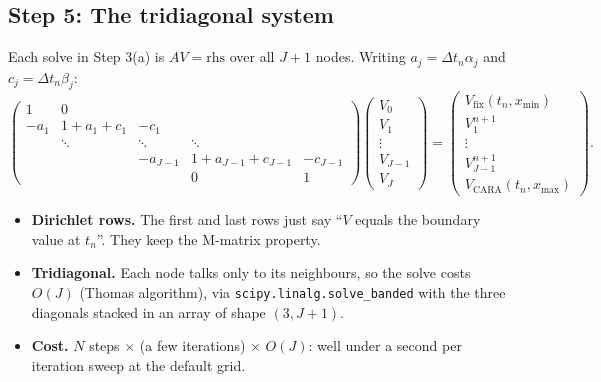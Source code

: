 \documentclass[11pt]{article}
\begin{document}
\subsection*{Step 5: The tridiagonal system}
Each solve in Step 3(a) is $AV=\text{rhs}$ over all $J+1$ nodes. Writing
$a_j=\Delta t_n\alpha_j$ and $c_j=\Delta t_n\beta_j$:
\[
\begin{pmatrix}
1 & 0 \\
-a_1 & 1+a_1+c_1 & -c_1 \\
 & \ddots & \ddots & \ddots \\
 & & -a_{J-1} & 1+a_{J-1}+c_{J-1} & -c_{J-1} \\
 & & & 0 & 1
\end{pmatrix}
\begin{pmatrix} V_0 \\ V_1 \\ \vdots \\ V_{J-1} \\ V_J \end{pmatrix}
=
\begin{pmatrix} V_{\text{fix}}(t_n,x_{\min}) \\ V_1^{n+1} \\ \vdots \\ V_{J-1}^{n+1} \\
                V_{\text{CARA}}(t_n,x_{\max}) \end{pmatrix}.
\]
\begin{itemize}
  \item \textbf{Dirichlet rows.} The first and last rows just say ``$V$ equals the boundary
        value at $t_n$''. They keep the M-matrix property.
  \item \textbf{Tridiagonal.} Each node talks only to its neighbours, so the solve costs
        $O(J)$ (Thomas algorithm), via \texttt{scipy.linalg.solve\_banded} with the three
        diagonals stacked in an array of shape $(3,J+1)$.
  \item \textbf{Cost.} $N$ steps $\times$ (a few iterations) $\times$ $O(J)$: well under a
        second per iteration sweep at the default grid.
\end{itemize}
\end{document}
